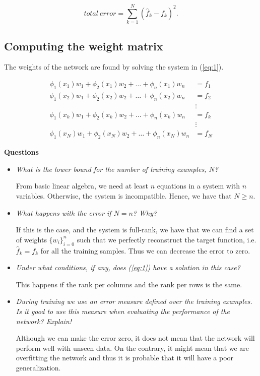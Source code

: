 \documentclass[letterpaper, 10 pt, conference]{ieeeconf}  %
\begin{document}
$$
total~error = \sum_{k=1}^N (\hat{f}_k-f_k)^2.
$$

\subsection{Computing the weight matrix}

The weights of the network are found by solving the system in (\ref{eq:1}).

\begin{equation}
\begin{split}
\phi_1(x_1)w_1 + \phi_2(x_1)w_2 + \dots + \phi_n(x_1)w_n &= f_1 \\
\phi_1(x_2)w_1 + \phi_2(x_2)w_2 + \dots + \phi_n(x_2)w_n &= f_2 \\
&\vdots \\
\phi_1(x_k)w_1 + \phi_2(x_k)w_2 + \dots + \phi_n(x_k)w_n &= f_k \\
&\vdots \\
\phi_1(x_N)w_1 + \phi_2(x_N)w_2 + \dots + \phi_n(x_N)w_n &= f_N
\end{split}
\label{eq:1}
\end{equation}

\begin{framed}
\textbf{Questions}
\begin{itemize}
\item \textit{What is the lower bound for the number of training examples, $N$?}

From basic linear algebra, we need at least $n$ equations in a system with $n$ variables. Otherwise, the system is incompatible. Hence, we have that $N\geq n$.

\item \textit{What happens with the error if $N=n$? Why?}

If this is the case, and the system is full-rank, we have that we can find a set of weights $\{w_i\}_{i=0}^n$ such that we perfectly reconstruct the target function, i.e. $\hat{f}_k = f_k$ for all the training samples. Thus we can decrease the error to zero.

\item \textit{Under what conditions, if any, does (\ref{eq:1}) have a solution in this case?}

This happens if the rank per columns and the rank per rows is the same.

\item \textit{During training we use an error measure defined over the training examples. Is it good to use this measure when evaluating the performance of the network? Explain!}

Although we can make the error zero, it does not mean that the network will perform well with unseen data. On the contrary, it might mean that we are overfitting the network and thus it is probable that it will have a poor generalization.

\end{itemize}
\end{framed}
\end{document}
